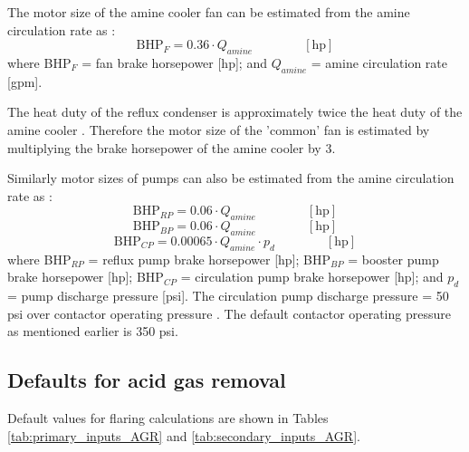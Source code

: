 \documentclass[11pt]{report}
\newcommand{\eqnunit}[1]{\quad\quad \scriptstyle{\left[\text{#1}\right]}}
\begin{document}
The motor size of the amine cooler fan can be estimated from the amine circulation rate as \cite[p. 118]{Manning1991}:
\begin{equation} \label{eq:BHP_fan}
\text{BHP}_{F} = 0.36\cdot Q_{amine}    \quad\quad\eqnunit{hp}
\end{equation}
where BHP$_{F}$ = fan brake horsepower [hp]; and  $Q_{amine}$ = amine circulation rate [gpm].

The heat duty of the reflux condenser is approximately twice the heat duty of the amine cooler \cite[p. 117]{Manning1991}. Therefore the motor size of the 'common' fan is estimated by multiplying the brake horsepower of the amine cooler by 3.

Similarly motor sizes of pumps can also be estimated from the amine circulation rate as \cite[p. 118]{Manning1991}: 
\begin{equation} \label{eq:BHP_reflux}
\text{BHP}_{RP}= 0.06 \cdot Q_{amine}    \quad\quad\eqnunit{hp}
\end{equation}
\begin{equation} \label{eq:BHP_booster}
\text{BHP}_{BP}= 0.06 \cdot Q_{amine}    \quad\quad\eqnunit{hp}
\end{equation}
\begin{equation} \label{eq:BHP_circulation}
\text{BHP}_{CP}=0.00065 \cdot Q_{amine} \cdot p_{d}   \quad\quad\eqnunit{hp}
\end{equation}
where BHP$_{RP}$ = reflux pump brake horsepower [hp]; BHP$_{BP}$ = booster pump brake horsepower [hp];  BHP$_{CP}$ = circulation pump brake horsepower [hp]; and $p_{d}$ = pump discharge pressure [psi]. The circulation pump discharge pressure = 50 psi over contactor operating pressure \cite[p. 121]{Manning1991}. The default contactor operating pressure as mentioned earlier is 350 psi. 

\subsection{Defaults for acid gas removal}

Default values for flaring calculations are shown in Tables \ref{tab:primary_inputs_AGR} and \ref{tab:secondary_inputs_AGR}.

\end{document}
